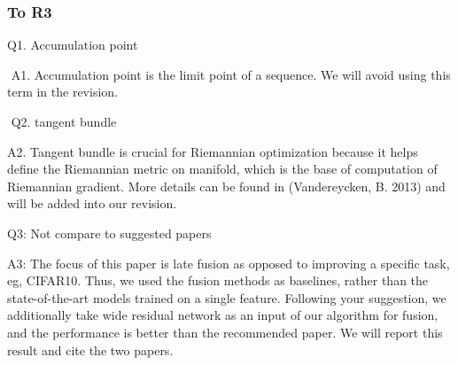 \documentclass[letterpaper]{article}
\begin{document}
\subsubsection{To R3}

Q1. Accumulation point 

 A1. Accumulation point is the limit point of a sequence. We will avoid using this term in the revision.

 Q2. tangent bundle 

A2. Tangent bundle is crucial for Riemannian optimization because it helps define the Riemannian metric on manifold, which is the base of computation of Riemannian gradient. More details can be found in (Vandereycken, B. 2013) and will be added into our revision.   

Q3: Not compare to suggested papers 

A3: The focus of this paper is late fusion as opposed to improving a specific task, eg, CIFAR10. Thus, we used the fusion methods as baselines, rather than the state-of-the-art models trained on a single feature. Following your suggestion, we additionally take wide residual network as an input of our algorithm for fusion, and the performance is better than the recommended paper. We will report this result and cite the two papers. 
\end{document}
